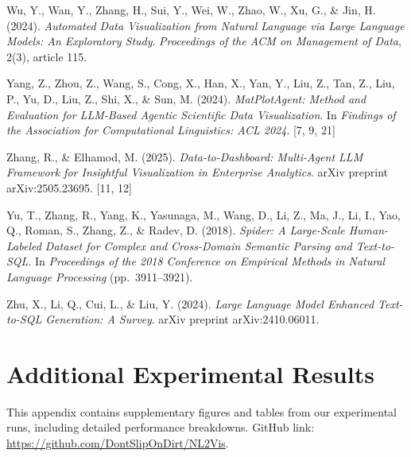 \documentclass[a4paper,oneside,bibliography=totoc]{scrbook}
\begin{document}
\begin{thebibliography}{}
  Wu, Y., Wan, Y., Zhang, H., Sui, Y., Wei, W., Zhao, W., Xu, G., \& Jin, H. (2024).
  \textit{Automated Data Visualization from Natural Language via Large Language Models: An Exploratory Study}.
  \textit{Proceedings of the ACM on Management of Data}, 2(3), article 115.

  Yang, Z., Zhou, Z., Wang, S., Cong, X., Han, X., Yan, Y., Liu, Z., Tan, Z., Liu, P., Yu, D., Liu, Z., Shi, X., \& Sun, M. (2024).
  \textit{MatPlotAgent: Method and Evaluation for LLM-Based Agentic Scientific Data Visualization}.
  In \textit{Findings of the Association for Computational Linguistics: ACL 2024}. [7, 9, 21]

  Zhang, R., \& Elhamod, M. (2025).
  \textit{Data-to-Dashboard: Multi-Agent LLM Framework for Insightful Visualization in Enterprise Analytics}.
  arXiv preprint arXiv:2505.23695. [11, 12]

  Yu, T., Zhang, R., Yang, K., Yasunaga, M., Wang, D., Li, Z., Ma, J., Li, I., Yao, Q., Roman, S., Zhang, Z., \& Radev, D. (2018).
  \textit{Spider: A Large-Scale Human-Labeled Dataset for Complex and Cross-Domain Semantic Parsing and Text-to-SQL}.
  In \textit{Proceedings of the 2018 Conference on Empirical Methods in Natural Language Processing} (pp.\ 3911--3921).

  Zhu, X., Li, Q., Cui, L., \& Liu, Y. (2024).
  \textit{Large Language Model Enhanced Text-to-SQL Generation: A Survey}.
  arXiv preprint arXiv:2410.06011.

\end{thebibliography}


\appendix
\chapter{Additional Experimental Results}

This appendix contains supplementary figures and tables from our experimental runs, including detailed performance breakdowns.
GitHub link: \url{https://github.com/DontSlipOnDirt/NL2Vis}.


\newcommand{\gr}[1]{\textcolor{goodgreen}{#1}}
\newcommand{\rd}[1]{\textcolor{badred}{#1}}
\end{document}
